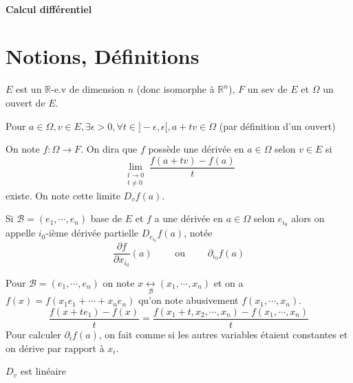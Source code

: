 \ifsolo
~

\vspace{1cm}

\begin{center}
    \textbf{\LARGE Calcul différentiel} \\[1em]
\end{center}
\tableofcontents
\else
\minitoc
\fi
\thispagestyle{empty}

\ifsolo \newpage \setcounter{page}{1} \fi
\section{Notions, Définitions}

$E$ est un $\mathbb R$-e.v de dimension $n$ (donc isomorphe à $\mathbb R^n$), $F$ un sev de $E$ et $\Omega$ un ouvert de $E$.

\begin{rem}
    Pour $a\in\Omega, v\in E, \exists \epsilon>0, \forall t\in ]-\epsilon, \epsilon[, a+tv\in\Omega$ (par définition d'un ouvert)
\end{rem}

\begin{dfn}
    On note $f:\Omega \longrightarrow F$. On dira que $f$ possède une dérivée en $a\in\Omega$ selon $v\in E$ si \[
        \lim_{\substack{t\to 0\\ t\neq 0}}\frac{f(a+tv)-f(a)}t
    \] existe. On note cette limite $D_vf(a)$.

    Si $\mathcal B=(e_1,\cdots, e_n)$ base de $E$ et $f$ a une dérivée en $a\in\Omega$ selon $e_{i_0}$ alors on appelle $i_0$-ième dérivée partielle $D_{e_{i_0}}f(a)$, notée \[
        \frac{\partial f}{\partial x_{i_0}}(a)\qquad \text{ ou }\qquad \partial_{i_0}f(a)
    \]
\end{dfn}

\begin{rem}
    Pour $\mathcal B=(e_1, \cdots, e_n)$ on note $x\underset{\mathcal B}{\longleftrightarrow}(x_1, \cdots, x_n)$ et on a $f(x)=f(x_1e_1+\cdots + x_ne_n)$ qu'on note abusivement $f(x_1, \cdots, x_n)$. \[
        \frac{f(x+te_1)-f(x)}{t}=\frac{f(x_1+t, x_2, \cdots, x_n)-f(x_1, \cdots, x_n)}{t}
    \]
    Pour calculer $\partial_if(a)$, on fait comme si les autres variables étaient constantes et on dérive par rapport à $x_i$.
\end{rem}

\begin{rem}
    $D_v$ est linéaire
\end{rem}

